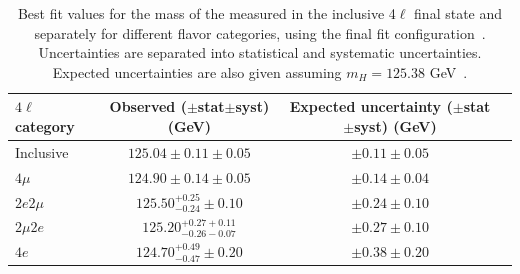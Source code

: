 
\begin{table}[!htb]	
  \centering
    \begin{tabular}{lccc}
      $4\ell$ category & Observed ($\pm$stat$\pm$syst) (GeV) & Expected uncertainty ($\pm$stat$\pm$syst) (GeV)  \\
      \hline
      Inclusive  & $125.04\pm0.11 \pm 0.05$	&	 $\pm 0.11\pm  0.05$ \\
      $4\mu$ & $124.90 \pm 0.14 \pm 0.05$	&	$\pm 0.14\pm  0.04$ \\
      $2e2\mu$ &        $125.50^{+0.25}_{-0.24}\pm0.10$      &       $\pm0.24\pm0.10$ \\
      $2\mu2e$ &        $125.20^{+0.27+0.11}_{-0.26-0.07}$     &        $\pm0.27\pm0.10$ \\
      $4e$ &	$124.70^{+0.49}_{-0.47}\pm0.20$     &	$\pm0.38\pm0.20$ \\ 
  \end{tabular}
  \caption{Best fit values for the mass of the \Hboson measured in the inclusive 4$\ell$ final state and separately for different flavor categories, using the final fit configuration~\cite{PhysRevD.111.092014}. Uncertainties are separated into statistical and systematic uncertainties. Expected uncertainties are also given assuming $m_{H} = 125.38$ GeV~\cite{Sirunyan:2020xwk}.}
  \label{table:Mass_results}
\end{table}

